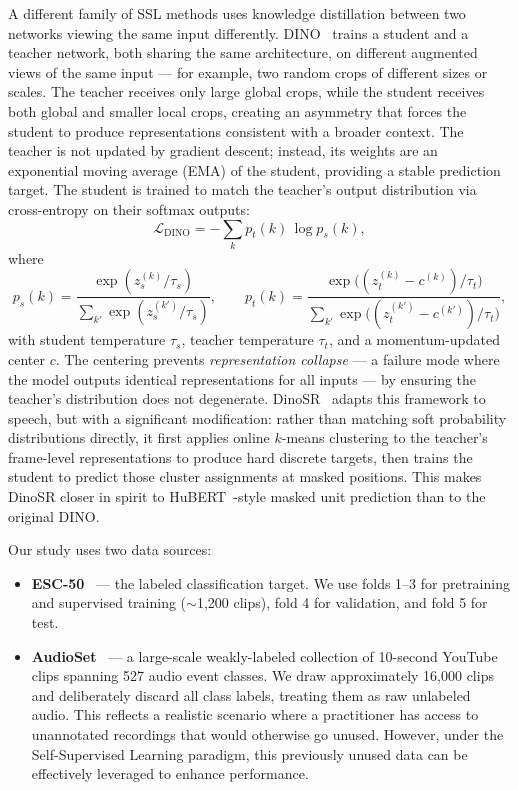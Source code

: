 \documentclass{article}
\begin{document}
A different family of SSL methods uses knowledge distillation between two networks viewing the same input differently. DINO~\cite{caron2021emerging} trains a student and a teacher network, both sharing the same architecture, on different augmented views of the same input — for example, two random crops of different sizes or scales. The teacher receives only large global crops, while the student receives both global and smaller local crops, creating an asymmetry that forces the student to produce representations consistent with a broader context. The teacher is not updated by gradient descent; instead, its weights are an exponential moving average (EMA) of the student, providing a stable prediction target. The student is trained to match the teacher's output distribution via cross-entropy on their softmax outputs:
\[
    \mathcal{L}_\text{DINO} = -\sum_{k} p_t(k)\,\log p_s(k),
\]
where
\[
    p_s(k) = \frac{\exp(z_s^{(k)}/\tau_s)}{\sum_{k'}\exp(z_s^{(k')}/\tau_s)}, \qquad
    p_t(k) = \frac{\exp\!\bigl((z_t^{(k)} - c^{(k)})/\tau_t\bigr)}{\sum_{k'}\exp\!\bigl((z_t^{(k')} - c^{(k')})/\tau_t\bigr)},
\]
with student temperature $\tau_s$, teacher temperature $\tau_t$, and a momentum-updated center $c$. The centering prevents \emph{representation collapse} — a failure mode where the model outputs identical representations for all inputs — by ensuring the teacher's distribution does not degenerate. DinoSR~\cite{liu2023dinosr} adapts this framework to speech, but with a significant modification: rather than matching soft probability distributions directly, it first applies online $k$-means clustering to the teacher's frame-level representations to produce hard discrete targets, then trains the student to predict those cluster assignments at masked positions. This makes DinoSR closer in spirit to HuBERT~\cite{hsu2021hubert}-style masked unit prediction than to the original DINO.

Our study uses two data sources:
\begin{itemize}
    \item \textbf{ESC-50}~\cite{piczak2015esc} — the labeled classification target. We use folds 1--3 for pretraining and supervised training ($\sim$1,200 clips), fold 4 for validation, and fold 5 for test.
    \item \textbf{AudioSet}~\cite{gemmeke2017audioset} — a large-scale weakly-labeled collection of 10-second YouTube clips spanning 527 audio event classes. We draw approximately 16,000 clips and deliberately discard all class labels, treating them as raw unlabeled audio. This reflects a realistic scenario where a practitioner has access to unannotated recordings that would otherwise go unused. However, under the Self-Supervised Learning paradigm, this previously unused data can be effectively leveraged to enhance performance.
\end{itemize}
\end{document}
